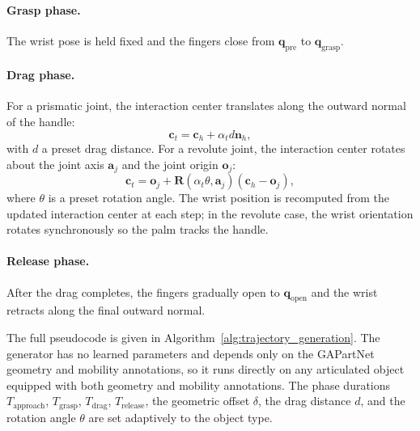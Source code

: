 \paragraph{Grasp phase.}
The wrist pose is held fixed and the fingers close from
$\mathbf{q}_{\mathrm{pre}}$ to $\mathbf{q}_{\mathrm{grasp}}$.

\paragraph{Drag phase.}
For a prismatic joint, the interaction center translates along the
outward normal of the handle:
\begin{equation}
\mathbf{c}_t = \mathbf{c}_h + \alpha_t d \mathbf{n}_h,
\end{equation}
with $d$ a preset drag distance. For a revolute joint, the
interaction center rotates about the joint axis $\mathbf{a}_j$ and
the joint origin $\mathbf{o}_j$:
\begin{equation}
\mathbf{c}_t = \mathbf{o}_j + \mathbf{R}(\alpha_t\theta,
\mathbf{a}_j)(\mathbf{c}_h - \mathbf{o}_j),
\end{equation}
where $\theta$ is a preset rotation angle. The wrist position is
recomputed from the updated interaction center at each step; in the
revolute case, the wrist orientation rotates synchronously so the
palm tracks the handle.

\paragraph{Release phase.}
After the drag completes, the fingers gradually open to
$\mathbf{q}_{\mathrm{open}}$ and the wrist retracts along the final
outward normal.

The full pseudocode is given in
Algorithm~\ref{alg:trajectory_generation}. The generator has no
learned parameters and depends only
on the GAPartNet geometry and mobility annotations, so it runs
directly on any articulated object equipped with both geometry and
mobility annotations. The phase
durations $T_{\mathrm{approach}}$, $T_{\mathrm{grasp}}$,
$T_{\mathrm{drag}}$, $T_{\mathrm{release}}$, the geometric offset
$\delta$, the drag distance $d$, and the rotation angle $\theta$
are set adaptively to the object type.


